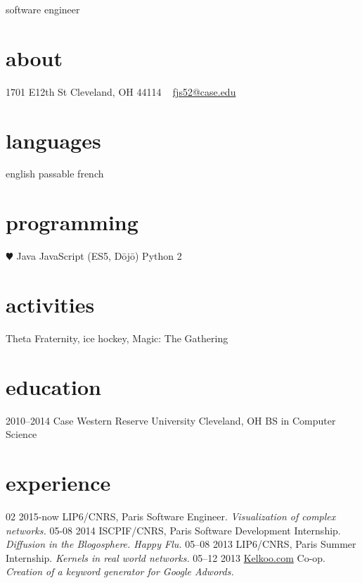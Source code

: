 \documentclass[]{friggeri-cv}
\begin{document}
       {software engineer}


\begin{aside}
  \section{about}
    1701 E12th St
    Cleveland, OH
    44114
    ~
    \href{mailto:fjs52@case.edu}{fjs52@case.edu}
  \section{languages}
    english
    passable french
  \section{programming}
    {\color{red} $\varheartsuit$} Java
    JavaScript
    (ES5, D\=oj\=o)
    Python 2
\end{aside}

\section{activities}
 Theta \Chi Fraternity, ice hockey, Magic: The Gathering

\section{education}

\begin{entrylist}
  \entry
    {2010–2014}
    {Case Western Reserve University}
    {Cleveland, OH}
    {BS in Computer Science}
\end{entrylist}

\section{experience}

\begin{entrylist}
  \entry
    {02 2015-now}
    {LIP6/CNRS, Paris}
    {Software Engineer.}
    {\emph{Visualization of complex networks.}}
  \entry
    {05-08 2014}
    {ISCPIF/CNRS, Paris}
    {Software Development Internship.}
    {\emph{Diffusion in the Blogosphere. Happy Flu.}}
  \entry
    {05–08 2013}
    {LIP6/CNRS, Paris}
    {Summer Internship.}
    {\emph{Kernels in real world networks.}}
  \entry
    {05–12 2013}
    {\href{http://www.kelkoo.com}{Kelkoo.com}}
    {Co-op.}
    {\emph{Creation of a keyword generator for Google Adwords.}}
\end{entrylist}
\end{document}
